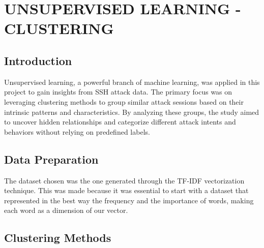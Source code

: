 

\section{UNSUPERVISED LEARNING - CLUSTERING}


    \subsection{Introduction}
    
        Unsupervised learning, a powerful branch of machine learning, was applied in this project to gain insights from SSH attack data. The primary focus was on leveraging clustering methods to group similar attack sessions based on their intrinsic patterns and characteristics. By analyzing these groups, the study aimed to uncover hidden relationships and categorize different attack intents and behaviors without relying on predefined labels. 
    
    \subsection{Data Preparation}
    
        The dataset chosen was the one generated through the TF-IDF vectorization technique. This was made because it was essential to start with a dataset that represented in the best way the frequency and the importance of words, making each word as a dimension of our vector.

    \subsection{Clustering Methods}
    
